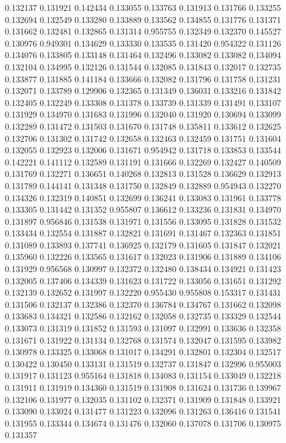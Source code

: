 0.132137
0.131921
0.142434
0.133055
0.133763
0.131913
0.131766
0.133255
0.132694
0.132549
0.133280
0.133889
0.133562
0.134855
0.131776
0.131371
0.131662
0.132481
0.132865
0.131314
0.955755
0.132349
0.132370
0.145527
0.130976
0.949301
0.134629
0.133330
0.133535
0.131420
0.954322
0.131126
0.134076
0.133805
0.133148
0.131464
0.132496
0.133082
0.133082
0.134094
0.132104
0.134995
0.132126
0.131544
0.132085
0.131843
0.132017
0.132735
0.133877
0.131885
0.141184
0.133666
0.132082
0.131796
0.131758
0.131231
0.132071
0.133789
0.129906
0.132365
0.131349
0.136031
0.133216
0.131842
0.132405
0.132249
0.133308
0.131378
0.133739
0.131339
0.131491
0.133107
0.131929
0.134970
0.131683
0.131996
0.132040
0.131920
0.130694
0.133099
0.132289
0.131472
0.131503
0.131670
0.131748
0.135811
0.133612
0.132625
0.132706
0.131302
0.131742
0.132658
0.132463
0.132459
0.131751
0.131604
0.132055
0.132923
0.132006
0.131671
0.954942
0.131718
0.133853
0.133544
0.142221
0.141112
0.132589
0.131191
0.131666
0.132269
0.132427
0.140509
0.131769
0.132271
0.136651
0.140268
0.132813
0.131528
0.136629
0.132913
0.131789
0.144141
0.131348
0.131750
0.132849
0.132889
0.954943
0.132270
0.134326
0.132319
0.140851
0.132699
0.136241
0.133083
0.131961
0.133778
0.133305
0.131442
0.131352
0.955807
0.136612
0.133236
0.131831
0.134970
0.131897
0.956846
0.131538
0.131971
0.131556
0.133095
0.131828
0.131532
0.133434
0.132554
0.131887
0.132821
0.131691
0.131467
0.132363
0.131851
0.131089
0.133893
0.137741
0.136925
0.132179
0.131605
0.131847
0.132021
0.135960
0.132226
0.133565
0.131617
0.132023
0.131906
0.131889
0.134106
0.131929
0.956568
0.130997
0.132372
0.132480
0.138434
0.134921
0.131423
0.132005
0.137406
0.134339
0.131623
0.131722
0.133056
0.131651
0.131292
0.132139
0.132652
0.131997
0.132220
0.955430
0.955808
0.153317
0.131431
0.131506
0.132137
0.132386
0.132370
0.136784
0.134767
0.131662
0.132098
0.133683
0.134321
0.132586
0.132162
0.132058
0.132735
0.133329
0.132544
0.133073
0.131319
0.131852
0.131593
0.131097
0.132991
0.133636
0.132358
0.131671
0.131922
0.131134
0.132768
0.131574
0.132047
0.131595
0.133982
0.130978
0.133325
0.133068
0.131017
0.134291
0.132801
0.132304
0.132517
0.130422
0.130450
0.133131
0.131519
0.132737
0.131847
0.132996
0.955003
0.131917
0.131123
0.955164
0.131818
0.134083
0.131154
0.133049
0.132218
0.131911
0.131919
0.134360
0.131519
0.131908
0.131624
0.131736
0.139967
0.132106
0.131977
0.132035
0.131102
0.132371
0.131909
0.131848
0.133921
0.133090
0.133024
0.131477
0.131223
0.132096
0.131263
0.136416
0.131541
0.131955
0.133344
0.134674
0.131476
0.132060
0.137078
0.131706
0.130975
0.131357
